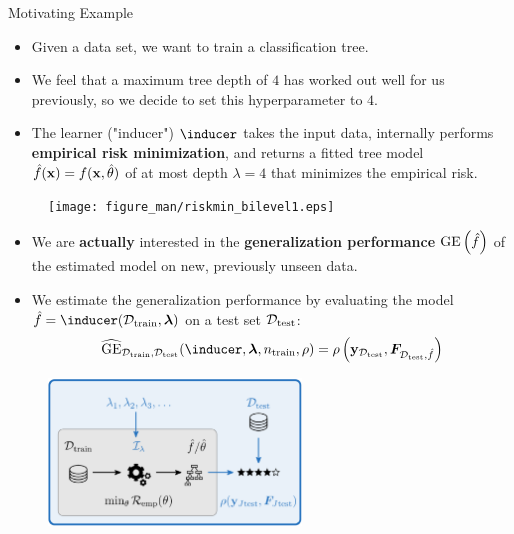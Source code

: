 \documentclass[11pt,compress,t,notes=noshow, xcolor=table]{beamer}
\begin{document}
\begin{vbframe}{Motivating Example} 

\begin{itemize}
\item Given a data set, we want to train a classification tree. 
\item We feel that a maximum tree depth of $4$ has worked out well for us previously, so we decide to set this hyperparameter to $4$. 
\item The learner ("inducer") $\inducer$ takes the input data, internally performs \textbf{empirical risk minimization}, and returns a fitted tree model $\hat{f}(\mathbf{x}) = f(\mathbf{x}, \hat{\theta})$ of at most depth $\lambda = 4$ that minimizes the empirical risk.
\end{itemize}

\begin{center}
\begin{figure}
\texttt{[image: figure\_man/riskmin\_bilevel1.eps]}
\end{figure}
\end{center}

\framebreak 

\begin{itemize}
\item We are \textbf{actually} interested in the \textbf{generalization performance} $\mathrm{GE}\left(\hat{f}\right)$ of the estimated model on new, previously unseen data. 
\item We estimate the generalization performance by evaluating the model $\fh = \inducer(\Dtrain, \lamv)$ on a test set $\mathcal{D}_{\text{test}}$: $$
\GEh_{\Dtrain, \Dtest}(\inducer,
  \lamv, \ntrain, \rho) =
  \rho \left( \yv_{\Dtest}, \F_{\Dtest, 
  \fh} \right)
$$
\end{itemize}
\vspace*{-0.6cm}
\begin{center}
\begin{figure}
\includegraphics[width=0.6\textwidth]{figure_man/riskmin_bilevel3.png}
\end{figure}
\end{center}


\end{vbframe}
\end{document}
